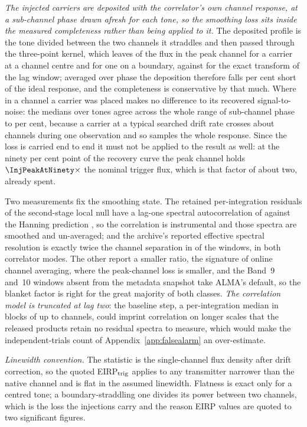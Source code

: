 \emph{The injected carriers are deposited with the correlator's own channel
response, at a sub-channel phase drawn afresh for each tone, so the smoothing
loss sits inside the measured completeness rather than being applied to it.}
The deposited profile is the tone divided between the two channels it
straddles and then passed through the three-point kernel, which leaves
\InjDepCentre{} of the flux in the peak channel for a carrier at a channel
centre and \InjDepEdge{} for one on a boundary, against \InjRespEdge{} for
the exact transform of the lag window; averaged over phase the deposition
therefore falls \InjShortPct{} per cent short of the ideal response, and the
completeness is conservative by that much. Where in a channel a carrier was
placed makes no difference to its recovered signal-to-noise: the medians over
\InjNPhaseTone{} tones agree across the whole range of sub-channel phase to
\InjPhaseFlatPct{} per cent, because a carrier at a typical searched drift
rate crosses about \InjDriftChan{} channels during one observation and so
samples the whole response. Since the loss is carried end to end it must not
be applied to the result as well: at the ninety per cent point of the
recovery curve the peak channel holds $\InjPeakAtNinety\times$ the nominal
trigger flux, which is that factor of about two, already spent.

Two measurements fix the smoothing state. The retained per-integration
residuals of the second-stage local null have a lag-one spectral
autocorrelation of \LNLagOne{} against the Hanning prediction \HanRhoOne, so
the correlation is instrumental and those spectra are smoothed and
un-averaged; and the archive's reported effective spectral resolution is
exactly twice the channel separation in \NHanTwo{} of the \NHanKnown{}
windows, in both correlator modes. The other \NHanOther{} report a smaller
ratio, the signature of online channel averaging, where the peak-channel loss
is smaller, and the \NNoArchRes{} Band~9 and~10 windows absent from the
metadata snapshot take ALMA's default, so the blanket factor is right for the
great majority of both classes. \emph{The correlation model is truncated at
lag two}: the baseline step, a per-integration median in blocks of up to
\MedWin{} channels, could imprint correlation on longer scales that the
released products retain no residual spectra to measure, which would make the
independent-trials count of Appendix~\ref{app:falsealarm} an over-estimate.

\emph{Linewidth convention.} The statistic is the single-channel flux
density after drift correction, so the quoted EIRP$_{\rm trig}$ applies to
any transmitter narrower than the native channel and is flat in the assumed
linewidth. Flatness is exact only for a centred tone; a boundary-straddling
one divides its power between two channels, which is the loss the injections
carry and the reason EIRP values are quoted to two significant figures.

